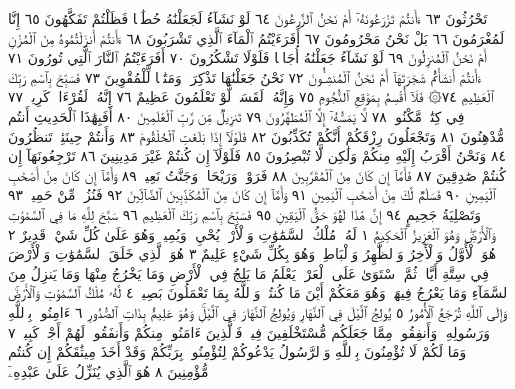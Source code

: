 تَحْرُثُونَ ٦٣ ءَأَنتُمْ تَزْرَعُونَهُۥٓ أَمْ نَحْنُ ٱلزَّٰرِعُونَ ٦٤ لَوْ نَشَآءُ لَجَعَلْنَٰهُ
حُطَٰمࣰا فَظَلْتُمْ تَفَكَّهُونَ ٦٥ إِنَّا لَمُغْرَمُونَ ٦٦ بَلْ نَحْنُ
مَحْرُومُونَ ٦٧ أَفَرَءَيْتُمُ ٱلْمَآءَ ٱلَّذِي تَشْرَبُونَ ٦٨ ءَأَنتُمْ أَنزَلْتُمُوهُ
مِنَ ٱلْمُزْنِ أَمْ نَحْنُ ٱلْمُنزِلُونَ ٦٩ لَوْ نَشَآءُ جَعَلْنَٰهُ أُجَاجࣰا فَلَوْلَا
تَشْكُرُونَ ٧٠ أَفَرَءَيْتُمُ ٱلنَّارَ ٱلَّتِي تُورُونَ ٧١ ءَأَنتُمْ أَنشَأْتُمْ
شَجَرَتَهَآ أَمْ نَحْنُ ٱلْمُنشِـُٔونَ ٧٢ نَحْنُ جَعَلْنَٰهَا تَذْكِرَةࣰ وَمَتَٰعࣰا
لِّلْمُقْوِينَ ٧٣ فَسَبِّحْ بِٱسْمِ رَبِّكَ ٱلْعَظِيمِ ٧٤۞ فَلَآ أُقْسِمُ
بِمَوَٰقِعِ ٱلنُّجُومِ ٧٥ وَإِنَّهُۥ لَقَسَمࣱ لَّوْ تَعْلَمُونَ عَظِيمٌ ٧٦
إِنَّهُۥ لَقُرْءَانࣱ كَرِيمࣱ ٧٧ فِي كِتَٰبࣲ مَّكْنُونࣲ ٧٨ لَّا يَمَسُّهُۥٓ إِلَّا
ٱلْمُطَهَّرُونَ ٧٩ تَنزِيلࣱ مِّن رَّبِّ ٱلْعَٰلَمِينَ ٨٠ أَفَبِهَٰذَا ٱلْحَدِيثِ
أَنتُم مُّدْهِنُونَ ٨١ وَتَجْعَلُونَ رِزْقَكُمْ أَنَّكُمْ تُكَذِّبُونَ ٨٢ فَلَوْلَآ
إِذَا بَلَغَتِ ٱلْحُلْقُومَ ٨٣ وَأَنتُمْ حِينَئِذࣲ تَنظُرُونَ ٨٤ وَنَحْنُ أَقْرَبُ
إِلَيْهِ مِنكُمْ وَلَٰكِن لَّا تُبْصِرُونَ ٨٥ فَلَوْلَآ إِن كُنتُمْ غَيْرَ مَدِينِينَ ٨٦
تَرْجِعُونَهَآ إِن كُنتُمْ صَٰدِقِينَ ٨٧ فَأَمَّآ إِن كَانَ مِنَ ٱلْمُقَرَّبِينَ ٨٨
فَرَوْحࣱ وَرَيْحَانࣱ وَجَنَّتُ نَعِيمࣲ ٨٩ وَأَمَّآ إِن كَانَ مِنْ أَصْحَٰبِ
ٱلْيَمِينِ ٩٠ فَسَلَٰمࣱ لَّكَ مِنْ أَصْحَٰبِ ٱلْيَمِينِ ٩١ وَأَمَّآ إِن كَانَ مِنَ
ٱلْمُكَذِّبِينَ ٱلضَّآلِّينَ ٩٢ فَنُزُلࣱ مِّنْ حَمِيمࣲ ٩٣ وَتَصْلِيَةُ جَحِيمٍ ٩٤
إِنَّ هَٰذَا لَهُوَ حَقُّ ٱلْيَقِينِ ٩٥ فَسَبِّحْ بِٱسْمِ رَبِّكَ ٱلْعَظِيمِ ٩٦
سَبَّحَ لِلَّهِ مَا فِي ٱلسَّمَٰوَٰتِ وَٱلْأَرْضِۖ وَهُوَ ٱلْعَزِيزُ ٱلْحَكِيمُ ١ لَهُۥ مُلْكُ
ٱلسَّمَٰوَٰتِ وَٱلْأَرْضِۖ يُحْيِۦ وَيُمِيتُۖ وَهُوَ عَلَىٰ كُلِّ شَيْءࣲ قَدِيرٌ ٢ هُوَ
ٱلْأَوَّلُ وَٱلْأٓخِرُ وَٱلظَّٰهِرُ وَٱلْبَاطِنُۖ وَهُوَ بِكُلِّ شَيْءٍ عَلِيمٌ ٣
هُوَ ٱلَّذِي خَلَقَ ٱلسَّمَٰوَٰتِ وَٱلْأَرْضَ فِي سِتَّةِ أَيَّامࣲ ثُمَّ ٱسْتَوَىٰ
عَلَى ٱلْعَرْشِۖ يَعْلَمُ مَا يَلِجُ فِي ٱلْأَرْضِ وَمَا يَخْرُجُ مِنْهَا وَمَا يَنزِلُ مِنَ
ٱلسَّمَآءِ وَمَا يَعْرُجُ فِيهَاۖ وَهُوَ مَعَكُمْ أَيْنَ مَا كُنتُمْۚ وَٱللَّهُ بِمَا تَعْمَلُونَ
بَصِيرࣱ ٤ لَّهُۥ مُلْكُ ٱلسَّمَٰوَٰتِ وَٱلْأَرْضِۚ وَإِلَى ٱللَّهِ تُرْجَعُ ٱلْأُمُورُ ٥
يُولِجُ ٱلَّيْلَ فِي ٱلنَّهَارِ وَيُولِجُ ٱلنَّهَارَ فِي ٱلَّيْلِۚ وَهُوَ عَلِيمُۢ بِذَاتِ
ٱلصُّدُورِ ٦ ءَامِنُوا۟ بِٱللَّهِ وَرَسُولِهِۦ وَأَنفِقُوا۟ مِمَّا جَعَلَكُم
مُّسْتَخْلَفِينَ فِيهِۖ فَٱلَّذِينَ ءَامَنُوا۟ مِنكُمْ وَأَنفَقُوا۟ لَهُمْ أَجْرࣱ كَبِيرࣱ ٧
وَمَا لَكُمْ لَا تُؤْمِنُونَ بِٱللَّهِ وَٱلرَّسُولُ يَدْعُوكُمْ لِتُؤْمِنُوا۟ بِرَبِّكُمْ وَقَدْ
أَخَذَ مِيثَٰقَكُمْ إِن كُنتُم مُّؤْمِنِينَ ٨ هُوَ ٱلَّذِي يُنَزِّلُ عَلَىٰ عَبْدِهِۦٓ
